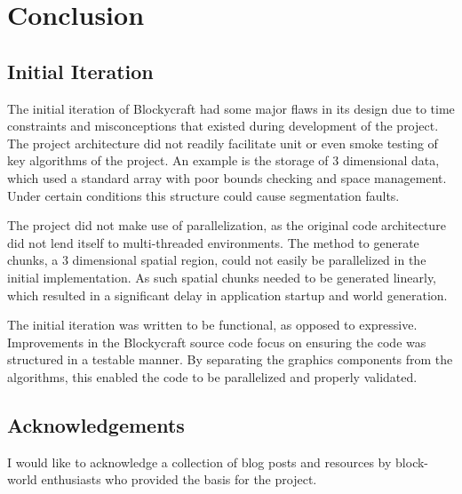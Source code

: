 \documentclass{book}
\newcommand{\Blockycraft}{Blockycraft}
\begin{document}
\chapter{Conclusion}
\section{Initial Iteration}
The initial iteration of \Blockycraft{} had some major flaws in its design due to time constraints and misconceptions that existed during development of the project.  The project architecture did not readily facilitate unit or even smoke testing of key algorithms of the project.  An example is the storage of 3 dimensional data, which used a standard array with poor bounds checking and space management.  Under certain conditions this structure could cause segmentation faults.   

The project did not make use of parallelization, as the original code architecture did not lend itself to multi-threaded environments.  The method to generate chunks, a 3 dimensional spatial region, could not easily be parallelized in the initial implementation.  As such spatial chunks needed to be generated linearly, which resulted in a significant delay in application startup and world generation.

The initial iteration was written to be functional, as opposed to expressive.  Improvements in the \Blockycraft{} source code focus on ensuring the code was structured in a testable manner.  By separating the graphics components from the algorithms, this enabled the code to be parallelized and properly validated.

\section{Acknowledgements}
I would like to acknowledge a collection of blog posts and resources by block-world enthusiasts who provided the basis for the project.
\end{document}
